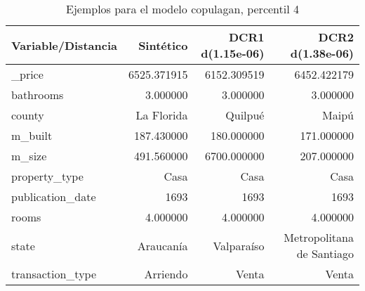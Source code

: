 \begin{table}[H]
\centering
\fontsize{10}{14}\selectfont
\caption{Ejemplos para el modelo copulagan, percentil 4}
\label{table-example-economicos-a-1-copulagan-4p}
\begin{tabular}{|l|r|r|r|}
\hline
\rowcolor[gray]{0.8}
Variable/Distancia & Sintético & DCR1 d(1.15e-06) & DCR2 d(1.38e-06) \\
\hline \_price & \cellcolor[rgb]{0.9, 0.54, 0.52} 6525.371915 & 6152.309519 & 6452.422179 \\
\hline bathrooms & \cellcolor[rgb]{0.9, 0.54, 0.52} 3.000000 & \cellcolor[rgb]{0.9, 0.54, 0.52} 3.000000 & \cellcolor[rgb]{0.9, 0.54, 0.52} 3.000000 \\
\hline county & \cellcolor[rgb]{0.9, 0.54, 0.52} La Florida & Quilpué & Maipú \\
\hline m\_built & \cellcolor[rgb]{0.9, 0.54, 0.52} 187.430000 & 180.000000 & 171.000000 \\
\hline m\_size & \cellcolor[rgb]{0.9, 0.54, 0.52} 491.560000 & 6700.000000 & 207.000000 \\
\hline property\_type & \cellcolor[rgb]{0.9, 0.54, 0.52} Casa & \cellcolor[rgb]{0.9, 0.54, 0.52} Casa & \cellcolor[rgb]{0.9, 0.54, 0.52} Casa \\
\hline publication\_date & \cellcolor[rgb]{0.9, 0.54, 0.52} 1693 & \cellcolor[rgb]{0.9, 0.54, 0.52} 1693 & \cellcolor[rgb]{0.9, 0.54, 0.52} 1693 \\
\hline rooms & \cellcolor[rgb]{0.9, 0.54, 0.52} 4.000000 & \cellcolor[rgb]{0.9, 0.54, 0.52} 4.000000 & \cellcolor[rgb]{0.9, 0.54, 0.52} 4.000000 \\
\hline state & \cellcolor[rgb]{0.9, 0.54, 0.52} Araucanía & Valparaíso & Metropolitana de Santiago \\
\hline transaction\_type & \cellcolor[rgb]{0.9, 0.54, 0.52} Arriendo & Venta & Venta \\
\hline
\end{tabular}
\end{table}
